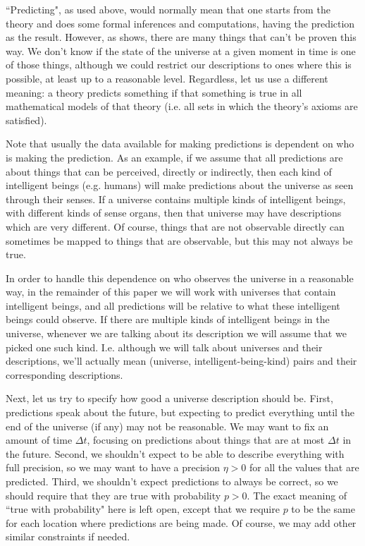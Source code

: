\documentclass[a4paper
,draft
]{article}
\newcommand{\ghilimele}[1]{``#1"}
\begin{document}
\ghilimele{Predicting}, as used above, would normally mean that one
starts from the theory and does some formal inferences and computations, having
the prediction as the result.
However, as \cite{Calude2013} shows, there are many
things that can't be proven this way.
We don't know if the state of the universe at a given moment in time is one of
those things, although we could restrict our descriptions to ones where this
is possible, at least up to a reasonable level.
Regardless, let us use a different meaning: a theory predicts something if
that something is true in all mathematical models of that theory (i.e. all
sets in which the theory's axioms are satisfied).

Note that usually the data available for making predictions is dependent
on who is making the prediction. As an example, if we assume that
all predictions are about things that can be perceived, directly or indirectly,
then
each kind of intelligent beings (e.g. humans) will make predictions
about the universe as seen through their senses. If a universe contains
multiple kinds of intelligent beings, with different kinds of
sense organs, then that universe may have descriptions which are
very different.
Of course, things that are not observable directly can sometimes be mapped
to things that are observable, but this may not always be true.

In order to handle this dependence on who observes the universe
in a reasonable way, in the remainder of this paper we will work with universes
that contain intelligent beings,
and all predictions will be relative to what these intelligent beings
could observe.
If there are multiple kinds of intelligent beings in the
universe, whenever we are talking about its description
we will assume that we picked one such kind.
I.e. although we
will talk about universes and their descriptions, we'll actually mean
(universe, intelligent-being-kind) pairs and their corresponding descriptions.

Next, let us try to specify how good a universe description
should be. First, predictions speak about the future, but expecting to
predict everything until the end of the universe (if any) may not be
reasonable. We may want to fix an amount of time $\Delta t$,
focusing on predictions about things that are at most
$\Delta t$ in the future. Second, we shouldn't expect to
be able to describe everything with full precision, so we may want to
have a precision $\eta>0$ for all the values that are predicted.
Third, we shouldn't expect predictions to always be correct, so
we should require that they are true with probability $p>0$.
The exact meaning of \ghilimele{true with probability} here is left open,
except that we require $p$ to be the same for each location where
predictions are being made.
Of course, we may add other similar constraints if needed.
\end{document}
